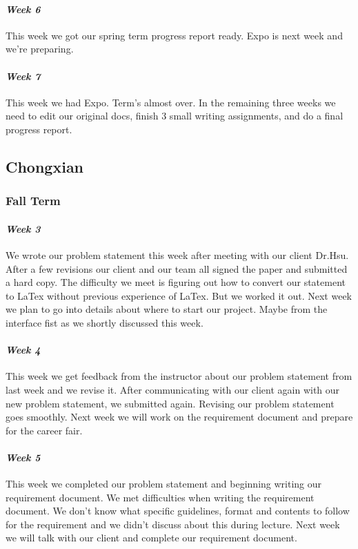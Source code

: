 \documentclass[onecolumn, draftclsnofoot,10pt, compsoc]{IEEEtran}
\begin{document}
\paragraph{\emph{Week 6}}
This week we got our spring term progress report ready. Expo is next week and we're preparing.
\paragraph{\emph{Week 7}}
This week we had Expo. Term's almost over. In the remaining three weeks we need to edit our original docs, finish 3 small writing assignments, and do a final progress report.

\subsection{Chongxian}
\subsubsection{Fall Term}
\paragraph{\emph{Week 3}}
We wrote our problem statement this week after meeting with our client Dr.Hsu. After a few revisions our client and our team all signed the paper and submitted a hard copy. The difficulty we meet is figuring out how to convert our statement to LaTex without previous experience of LaTex. But we worked it out. Next week we plan to go into details about where to start our project. Maybe from the interface fist as we shortly discussed this week.
\paragraph{\emph{Week 4}}
This week we get feedback from the instructor about our problem statement from last week and we revise it. After communicating with our client again with our new problem statement, we submitted again. Revising our problem statement goes smoothly. Next week we will work on the requirement document and prepare for the career fair.
\paragraph{\emph{Week 5}}
This week we completed our problem statement and beginning writing our requirement document. We met difficulties when writing the requirement document. We don't know what specific guidelines, format and contents to follow for the requirement and we didn't discuss about this during lecture. Next week we will talk with our client and complete our requirement document.
\end{document}
